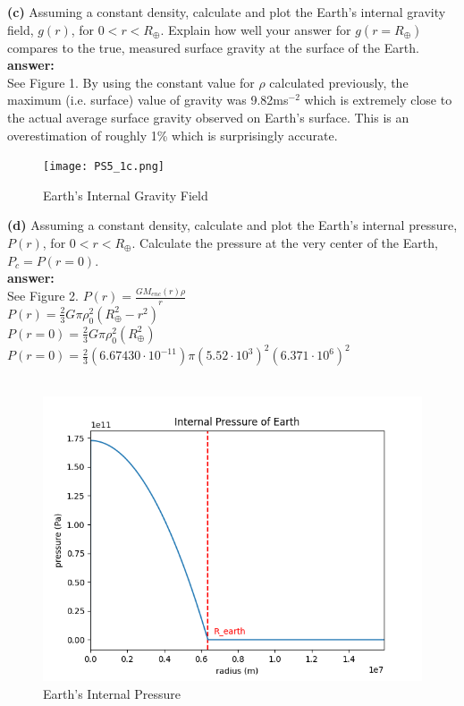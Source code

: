 \documentclass{article}
\begin{document}
    \textbf{(c)} Assuming a constant density, calculate and plot the Earth’s internal gravity field, $g(r)$, for $0 < r < R_{\oplus}$.
    Explain how well your answer for $g(r = R_{\oplus})$ compares to the true, measured surface gravity at the surface
    of the Earth. \\
    \textbf{answer:} \\
    See Figure 1.
    By using the constant value for $\rho$ calculated previously, the maximum (i.e. surface) value of gravity was
    9.82ms$^{-2}$ which is extremely close to the actual average surface gravity observed on Earth's surface. This is
    an overestimation of roughly 1\% which is surprisingly accurate.

    \begin{figure}[htp]
        \centering
        \texttt{[image: PS5\_1c.png]}
        \caption{Earth's Internal Gravity Field}
        \label{Graph 1}
    \end{figure}

    \newpage
    \textbf{(d)} Assuming a constant density, calculate and plot the Earth’s internal pressure, $P(r)$, for $0 < r < R_{\oplus}$.
    Calculate the pressure at the very center of the Earth, $P_{c} = P(r = 0)$. \\
    \textbf{answer:} \\
    See Figure 2.
    $P(r) = \frac{GM_{enc}(r)\rho}{r}$ \\
    $P(r) = \frac{2}{3}G \pi \rho_{0}^{2} (R_{\oplus}^2 - r^2)$ \\
    $P(r = 0) = \frac{2}{3}G \pi \rho_{0}^{2} (R_{\oplus}^{2})$ \\
    $P(r = 0) = \frac{2}{3} (6.67430 \cdot 10^{-11}) \pi (5.52 \cdot 10^{3})^{2} (6.371 \cdot 10^{6})^{2}$ \\
     \\

    \begin{figure}[htp]
        \centering
        \includegraphics[width=5in]{PS5_1d.png}
        \caption{Earth's Internal Pressure}
        \label{Graph 2}
    \end{figure}
\end{document}
